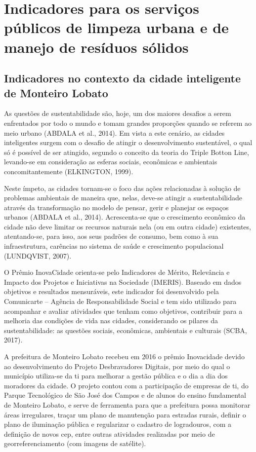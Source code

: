 	\section{Indicadores para os serviços públicos de limpeza urbana e de manejo de resíduos sólidos}
	
	\subsection{Indicadores no contexto da cidade inteligente de Monteiro Lobato}
	As questões de sustentabilidade são, hoje, um dos maiores desafios a serem enfrentados por todo o mundo e tomam grandes proporções quando se referem ao meio urbano (ABDALA et al., 2014). Em vista a este cenário, as cidades inteligentes surgem com o desafio de atingir o desenvolvimento sustentável, o qual só é possível de ser atingido, segundo o conceito da teoria do Triple Botton Line, levando-se em consideração as esferas sociais, econômicas e ambientais concomitantemente (ELKINGTON, 1999).
	
	Neste ímpeto, as cidades tornam-se o foco das ações relacionadas à solução de problemas ambientais de maneira que, nelas, deve-se atingir a sustentabilidade através da transformação no modelo de pensar, gerir e planejar os espaços urbanos (ABDALA et al., 2014). Acrescenta-se que o crescimento econômico da cidade não deve limitar os recursos naturais nela (ou em outra cidade) existentes, atentando-se, para isso, aos seus padrões de consumo, bem como à sua infraestrutura, carências no sistema de saúde e crescimento populacional (LUNDQVIST, 2007).
	
	O Prêmio InovaCidade orienta-se pelo Indicadores de Mérito, Relevância e Impacto dos Projetos e Iniciativas na Sociedade (IMERIS). Baseado em dados objetivos e resultados mensuráveis, este indicador foi desenvolvido pela Comunicarte – Agência de Responsabilidade Social e tem sido utilizado para acompanhar e avaliar atividades que tenham como objetivos, contribuir para a melhoria das condições de vida nas cidades, considerando os pilares da sustentabilidade: as questões sociais, econômicas, ambientais e culturais (SCBA, 2017).
	
	A prefeitura de Monteiro Lobato recebeu em 2016 o prêmio Inovacidade devido ao desenvolvimento do Projeto Desbravadores Digitais, por meio do qual o município utiliza-se da \gls{ti} para melhorar a gestão pública e o dia a dia dos moradores da cidade. O projeto contou com a participação de empresas de \gls{ti}, do Parque Tecnológico de São José dos Campos e de alunos do ensino fundamental de Monteiro Lobato, e serve de ferramenta para que a prefeitura possa monitorar áreas irregulares, traçar um plano de manutenção para estradas rurais, definir o plano de iluminação pública e regularizar o cadastro de logradouros, com a definição de novos \gls{cep}, entre outras atividades realizadas por meio de georreferenciamento (com imagens de satélite).
	
